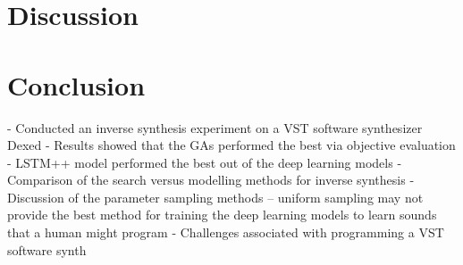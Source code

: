 \section{Discussion}
\label{sec:inverse-synth-discuss}


\section{Conclusion}

- Conducted an inverse synthesis experiment on a VST software synthesizer Dexed
- Results showed that the GAs performed the best via objective evaluation
- LSTM++ model performed the best out of the deep learning models
- Comparison of the search versus modelling methods for inverse synthesis
- Discussion of the parameter sampling methods -- uniform sampling may not provide the best method for training the deep learning models to learn sounds that a human might program
- Challenges associated with programming a VST software synth




